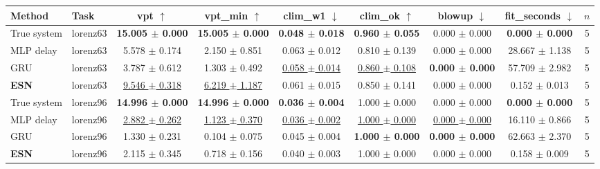 \begin{tabular}{llccccccc}
\toprule
Method & Task & vpt $\uparrow$ & vpt\_min $\uparrow$ & clim\_w1 $\downarrow$ & clim\_ok $\uparrow$ & blowup $\downarrow$ & fit\_seconds $\downarrow$ & $n$ \\
\midrule
True system & lorenz63 & \textbf{15.005 $\pm$ 0.000} & \textbf{15.005 $\pm$ 0.000} & \textbf{0.048 $\pm$ 0.018} & \textbf{0.960 $\pm$ 0.055} & 0.000 $\pm$ 0.000 & \textbf{0.000 $\pm$ 0.000} & 5 \\
MLP delay & lorenz63 & 5.578 $\pm$ 0.174 & 2.150 $\pm$ 0.851 & 0.063 $\pm$ 0.012 & 0.810 $\pm$ 0.139 & 0.000 $\pm$ 0.000 & 28.667 $\pm$ 1.138 & 5 \\
GRU & lorenz63 & 3.787 $\pm$ 0.612 & 1.303 $\pm$ 0.492 & \underline{0.058 $\pm$ 0.014} & \underline{0.860 $\pm$ 0.108} & \textbf{0.000 $\pm$ 0.000} & 57.709 $\pm$ 2.982 & 5 \\
\textbf{ESN} & lorenz63 & \underline{9.546 $\pm$ 0.318} & \underline{6.219 $\pm$ 1.187} & 0.061 $\pm$ 0.015 & 0.850 $\pm$ 0.141 & 0.000 $\pm$ 0.000 & 0.152 $\pm$ 0.013 & 5 \\
\midrule
True system & lorenz96 & \textbf{14.996 $\pm$ 0.000} & \textbf{14.996 $\pm$ 0.000} & \textbf{0.036 $\pm$ 0.004} & 1.000 $\pm$ 0.000 & 0.000 $\pm$ 0.000 & \textbf{0.000 $\pm$ 0.000} & 5 \\
MLP delay & lorenz96 & \underline{2.882 $\pm$ 0.262} & \underline{1.123 $\pm$ 0.370} & \underline{0.036 $\pm$ 0.002} & \underline{1.000 $\pm$ 0.000} & \underline{0.000 $\pm$ 0.000} & 16.110 $\pm$ 0.866 & 5 \\
GRU & lorenz96 & 1.330 $\pm$ 0.231 & 0.104 $\pm$ 0.075 & 0.045 $\pm$ 0.004 & \textbf{1.000 $\pm$ 0.000} & \textbf{0.000 $\pm$ 0.000} & 62.663 $\pm$ 2.370 & 5 \\
\textbf{ESN} & lorenz96 & 2.115 $\pm$ 0.345 & 0.718 $\pm$ 0.156 & 0.040 $\pm$ 0.003 & 1.000 $\pm$ 0.000 & 0.000 $\pm$ 0.000 & 0.158 $\pm$ 0.009 & 5 \\
\bottomrule
\end{tabular}
